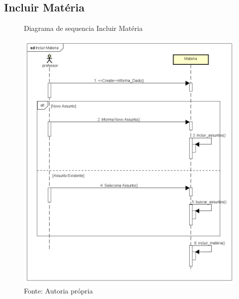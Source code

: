 \documentclass{utfpr-pg}
\begin{document}
    \subsection{Incluir Matéria}
        \begin{figure}[H]
            \centering
            \captionsetup{width=0.9\textwidth}
            \caption{Diagrama de sequencia Incluir Matéria}
            \includegraphics[width=0.95\linewidth]{fotos/seq2.png}
            \caption*{Fonte: Autoria própria}
            \label{fig:Diagrama de Classes}
        \end{figure}
        
\end{document}
